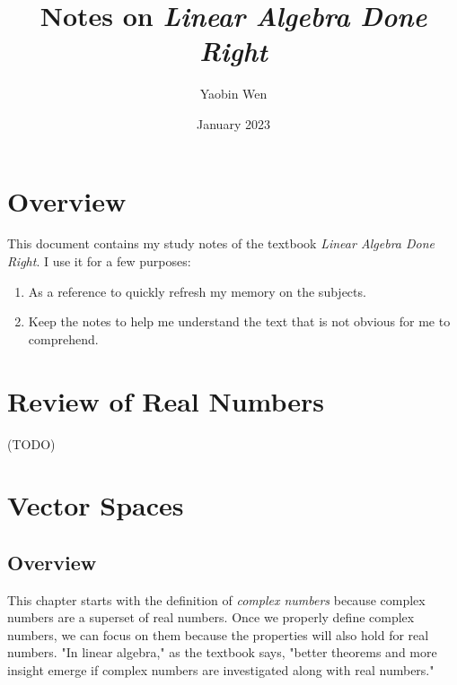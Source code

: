 \documentclass[12pt, letterpaper, oneside]{book}
\title{Notes on \textit{Linear Algebra Done Right}}
\author{Yaobin Wen}
\date{January 2023}
\begin{document}
\maketitle
\tableofcontents

\chapter*{Overview}

This document contains my study notes of the textbook \textit{Linear Algebra
Done Right}. I use it for a few purposes:

\begin{enumerate}
  \item As a reference to quickly refresh my memory on the subjects.
  \item Keep the notes to help me understand the text that is not obvious for
    me to comprehend.
\end{enumerate}

%
%

\chapter*{Review of Real Numbers}

(TODO)

%
%

\chapter{Vector Spaces}

\section*{Overview}

This chapter starts with the definition of \emph{complex numbers} because
complex numbers are a superset of real numbers. Once we properly define complex
numbers, we can focus on them because the properties will also hold for real
numbers. "In linear algebra," as the textbook says, "better theorems and more
insight emerge if complex numbers are investigated along with real numbers."
\end{document}
